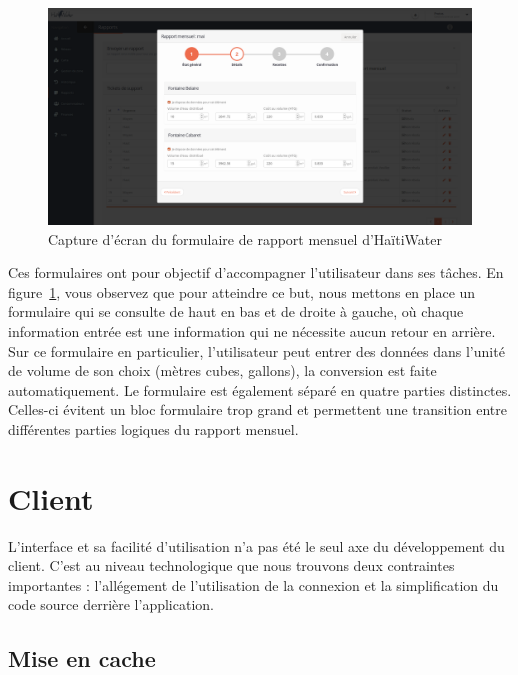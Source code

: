 \documentclass{EPL-master-thesis-covers-FR}
\begin{document}
			\begin{figure}[H]
				\includegraphics[width=\textwidth]{images/screen_rapport_mensuel.png}
				\caption{Capture d'écran du formulaire de rapport mensuel d'HaïtiWater}
				\label{fig:screen_rapport_mensuel}
			\end{figure}

			Ces formulaires ont pour objectif d'accompagner l'utilisateur dans ses tâches. En figure~\ref{fig:screen_rapport_mensuel}, vous observez que pour atteindre ce but, nous mettons en place un formulaire qui se consulte de haut en bas et de droite à gauche, où chaque information entrée est une information qui ne nécessite aucun retour en arrière. Sur ce formulaire en particulier, l'utilisateur peut entrer des données dans l'unité de volume de son choix (mètres cubes, gallons), la conversion est faite automatiquement. Le formulaire est également séparé en quatre parties distinctes. Celles-ci évitent un bloc formulaire trop grand et permettent une transition entre différentes parties logiques du rapport mensuel.

		\section{Client}

			L'interface et sa facilité d'utilisation n'a pas été le seul axe du développement du client. C'est au niveau technologique que nous trouvons deux contraintes importantes : l'allégement de l'utilisation de la connexion et la simplification du code source derrière l'application.

			\subsection*{Mise en cache}
				\label{sec:cache_client}
\end{document}
